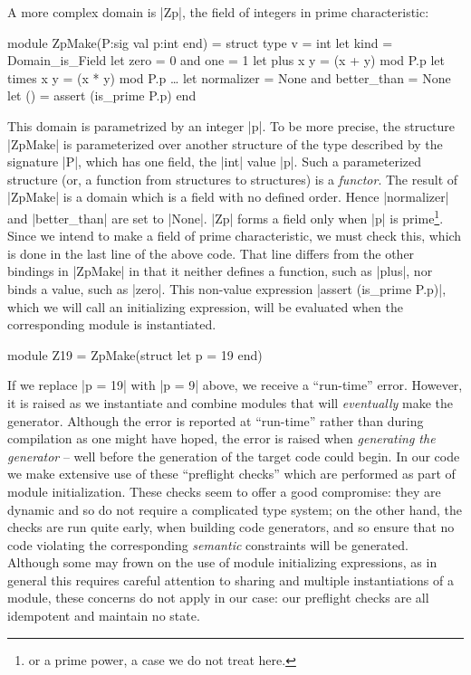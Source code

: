 \documentclass{elsart}
\begin{document}
A more complex domain is |Zp|, the field of integers in prime
characteristic:
\begin{code}[commandchars=\\\{\}]
module ZpMake(P:sig val p:int end) = struct
    type v = int
    let kind      = Domain_is_Field
    let zero      = 0 and one = 1
    let plus x y  = (x + y) mod P.p
    let times x y = (x * y) mod P.p
    \dots
    let normalizer = None and better_than = None
    let () = assert (is_prime P.p)
end
\end{code}
This domain is parametrized by an integer |p|. 
To be more precise, the structure |ZpMake| is
parameterized over another structure of the type described by
the signature |P|, which has one field, the |int| value |p|.
Such a parameterized structure (or, a function from structures to
structures) is a \emph{functor}. The result of |ZpMake| is a domain which is a
field with no defined order. Hence
|normalizer| and |better_than| are set to |None|. |Zp| forms
a field only when |p| is prime\footnote{or a prime power, a case we do
not treat here.}.  Since we intend to make a field of prime characteristic, 
we must check this, which is done
in the last line of the above code. That line differs from the other 
bindings in |ZpMake| in that it neither defines a function, such as
|plus|, nor binds a value, such as |zero|. This non-value
expression |assert (is_prime P.p)|, which we will call an initializing
expression, will be evaluated
when the corresponding module is instantiated.
\begin{code}
module Z19 = ZpMake(struct let p = 19 end)
\end{code}
If we
replace |p = 19| with |p = 9| above, we receive a ``run-time''
error. However, it is raised as we instantiate and combine modules that
will \emph{eventually} make the generator.  Although the error is reported at
``run-time'' rather than during compilation as one might have hoped, the error
is raised when \emph{generating the generator} -- well before the
generation of the target code could begin.  In our code we make
extensive use of these ``preflight checks'' which are performed as part of
module initialization. These checks seem to offer a good compromise:
they are dynamic and so do not require a complicated type system; on
the other hand, the checks are run quite early, when building
code generators, and so ensure that no code violating the
corresponding \emph{semantic} constraints will be generated. Although
some may frown on the use of module initializing expressions,
as in general this requires careful attention to sharing and multiple
instantiations of a module, these concerns do not apply in our case: our
preflight checks are all idempotent and maintain no state.
\end{document}
